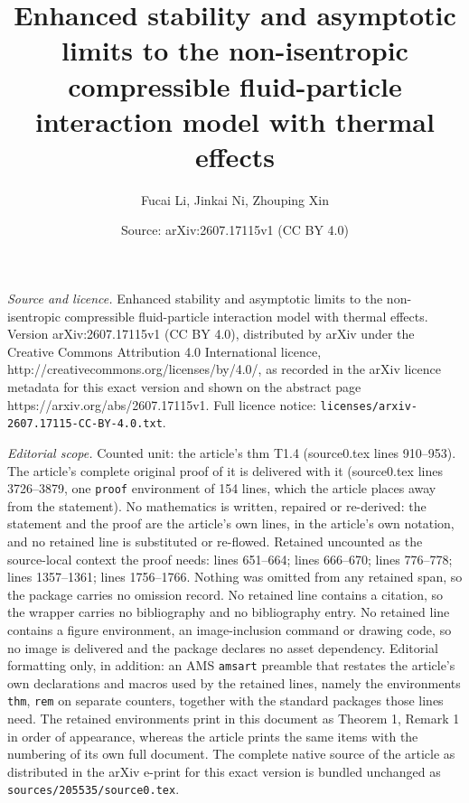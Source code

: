 \documentclass[10pt,a4paper]{amsart}
\title{Enhanced stability and asymptotic limits to the non-isentropic compressible fluid-particle interaction model with thermal effects}
\author{Fucai Li, Jinkai Ni, Zhouping Xin}
\date{Source: arXiv:2607.17115v1 (CC BY 4.0)}
\begin{document}
\maketitle

\noindent\emph{Source and licence.} Enhanced stability and asymptotic limits to the non-isentropic compressible fluid-particle interaction model with thermal effects. Version arXiv:2607.17115v1 (CC BY 4.0), distributed by arXiv under the Creative Commons Attribution 4.0 International licence, http://creativecommons.org/licenses/by/4.0/, as recorded in the arXiv licence metadata for this exact version and shown on the abstract page https://arxiv.org/abs/2607.17115v1. Full licence notice: \texttt{licenses/arxiv-2607.17115-CC-BY-4.0.txt}.\par\smallskip

\noindent\textit{Editorial scope.} Counted unit: the article's thm T1.4 (source0.tex lines 910--953). The article's complete original proof of it is delivered with it (source0.tex lines 3726--3879, one \texttt{proof} environment of 154 lines, which the article places away from the statement). No mathematics is written, repaired or re-derived: the statement and the proof are the article's own lines, in the article's own notation, and no retained line is substituted or re-flowed.  Retained uncounted as the source-local context the proof needs: lines 651--664; lines 666--670; lines 776--778; lines 1357--1361; lines 1756--1766.  Nothing was omitted from any retained span, so the package carries no omission record.  No retained line contains a citation, so the wrapper carries no bibliography and no bibliography entry.  No retained line contains a figure environment, an image-inclusion command or drawing code, so no image is delivered and the package declares no asset dependency.  Editorial formatting only, in addition: an AMS \texttt{amsart} preamble that restates the article's own declarations and macros used by the retained lines, namely the environments \texttt{thm}, \texttt{rem} on separate counters, together with the standard packages those lines need.  The retained environments print in this document as Theorem 1, Remark 1 in order of appearance, whereas the article prints the same items with the numbering of its own full document.  The complete native source of the article as distributed in the arXiv e-print for this exact version is bundled unchanged as \texttt{sources/205535/source0.tex}.
\end{document}
